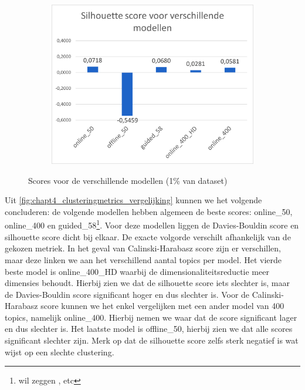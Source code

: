 \begin{figure}[H]
    \centering
    \begin{subfigure}{.5\textwidth}
        \centering
        \includegraphics[width=1\linewidth]{fig/chapt4/NLP/silhouette_model.png}
    \end{subfigure}
    \caption{Scores voor de verschillende modellen (1\% van dataset)}
    \label{fig:chapt4_clusteringmetrics_vergelijking}
\end{figure}

Uit \autoref{fig:chapt4_clusteringmetrics_vergelijking} kunnen we het volgende concluderen: de volgende modellen hebben algemeen de beste scores: online\_50, online\_400 en guided\_58\footnote{ wil zeggen , etc}. Voor deze modellen liggen de Davies-Bouldin score en silhouette score dicht bij elkaar. De exacte volgorde verschilt afhankelijk van de gekozen metriek. In het geval van Calinski-Harabasz score zijn er verschillen, maar deze linken we aan het verschillend aantal topics per model.\newline
Het vierde beste model is online\_400\_HD waarbij de dimensionaliteitsreductie meer dimensies behoudt. Hierbij zien we dat de silhouette score iets slechter is, maar de Davies-Bouldin score significant hoger en dus slechter is. Voor de Calinski-Harabasz score kunnen we het enkel vergelijken met een ander model van 400 topics, namelijk online\_400. Hierbij nemen we waar dat de score significant lager en dus slechter is. Het laatste model is offline\_50, hierbij zien we dat alle scores significant slechter zijn. Merk op dat de silhouette score zelfs sterk negatief is wat wijst op een slechte clustering.

